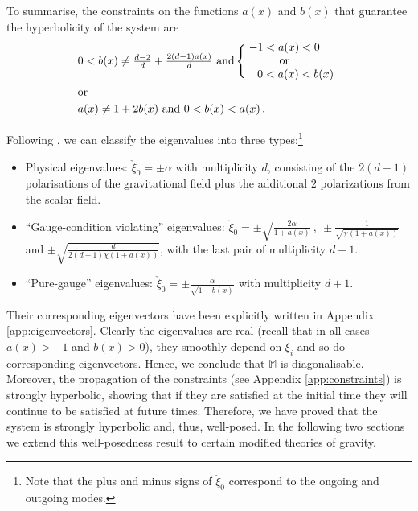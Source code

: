 \documentclass[reprint,aps,amsmath,amssymb,twoside,prd,showkeys,superscriptaddress,nofootinbib]{revtex4-2}
\begin{document}
To summarise, the constraints on the functions $a(x)$ and $b(x)$ that guarantee the hyperbolicity of the system are 
\begin{equation}
\begin{aligned}
&0<b(x)\neq\tfrac{d-2}{d}+\tfrac{2(d-1)a(x)}{d} \text{ and}\,\Bigg\{\hspace{-0.5cm}\begin{array}{cc}-1<a(x)<0 \\ \text{or} \\ \hspace{0.7cm}0 < a(x) < b(x)\end{array}\\
&\text{or}\\
&a(x)\neq 1+2b(x) \text{ and } 0 < b(x) < a(x)\,.
\end{aligned}
\end{equation}

Following \cite{Kovacs:2020pns,Kovacs:2020ywu}, we can classify the eigenvalues into three types:\footnote{Note that the plus and minus signs of $\check{\xi}_0$ correspond to the ongoing and outgoing modes.}
\begin{itemize}
    \item Physical eigenvalues: $\check{\xi}_0=\pm\alpha$ with multiplicity $d$, consisting of the $2(d-1)$  polarisations of the gravitational field plus the additional $2$ polarizations from the scalar field.
    \item ``Gauge-condition violating'' eigenvalues: $\check{\xi}_0=\pm\sqrt{\tfrac{2\alpha}{1+a(x)}}\,,~\pm\tfrac{1}{\sqrt{\chi(1+a(x))}}$ and $\pm\sqrt{\tfrac{d}{2(d-1)\chi(1+a(x))}}$, with the last pair of multiplicity $d-1$.
    \item ``Pure-gauge'' eigenvalues: $\check{\xi}_0=\pm\tfrac{\alpha}{\sqrt{1+b(x)}}$ with multiplicity $d+1$.
\end{itemize}
Their corresponding eigenvectors have been explicitly written in Appendix \ref{app:eigenvectors}. Clearly the eigenvalues are real (recall that in all cases $a(x)>-1$ and $b(x)>0$), they smoothly depend on $\xi_i$ and so do corresponding eigenvectors. Hence, we conclude that $\mathbb M$ is diagonalisable. Moreover, the propagation of the constraints (see Appendix \ref{app:constraints}) is strongly hyperbolic, showing that if they are satisfied at the initial time they will continue to be satisfied at future times. Therefore, we have proved that the system is strongly hyperbolic and, thus, well-posed. In the following two sections we extend this well-posedness result to certain modified theories of gravity.
\end{document}
